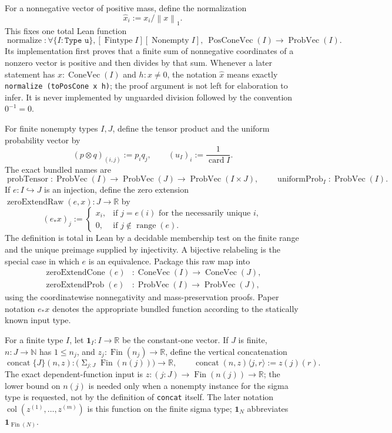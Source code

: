 \documentclass[9pt]{extarticle}
\theoremstyle{definition}
\theoremstyle{remark}
\newcommand{\R}{\mathbb R}
\newcommand{\N}{\mathbb N}
\newcommand{\one}{\mathbf 1}
\newcommand{\col}{\operatorname{col}}
\newcommand{\norm}[1]{\left\lVert #1\right\rVert}
\newcommand{\card}{\operatorname{card}}
\begin{document}
For a nonnegative vector of positive mass, define the normalization
\begin{equation}
 \widehat x_i:=x_i/\norm{x}_1.
 \label{eq:foundation-normalize}
\end{equation}
This fixes one total Lean function
\[
 \operatorname{normalize}:
 \forall\{I:\texttt{Type u}\},
 [\operatorname{Fintype}I][\operatorname{Nonempty}I],\
 \operatorname{PosConeVec}(I)\longrightarrow\operatorname{ProbVec}(I).
\]
Its implementation first proves that a finite sum of nonnegative
coordinates of a nonzero vector is positive and then divides by that sum.
Whenever a later statement has $x:\operatorname{ConeVec}(I)$ and
$h:x\neq0$, the notation $\widehat x$ means exactly
\texttt{normalize (toPosCone x h)}; the proof argument is not left for
elaboration to infer.  It is never implemented by
unguarded division followed by the convention $0^{-1}=0$.

For finite nonempty types $I,J$, define the tensor product and the uniform
probability vector by
\[
 (p\otimes q)_{(i,j)}:=p_iq_j,
 \qquad (u_I)_i:=\frac1{\card I}.
\]
The exact bundled names are
\[
 \operatorname{probTensor}:
 \operatorname{ProbVec}(I)\to\operatorname{ProbVec}(J)
 \to\operatorname{ProbVec}(I\times J),
 \qquad
 \operatorname{uniformProb}_I:\operatorname{ProbVec}(I).
\]
If $e:I\hookrightarrow J$ is an injection, define the zero extension
$\operatorname{zeroExtendRaw}(e,x):J\to\R$ by
\[
 (e_*x)_j:=
 \begin{cases}
  x_i,&\text{if }j=e(i)\text{ for the necessarily unique }i,\\
  0,&\text{if }j\notin\operatorname{range}(e).
 \end{cases}
\]
The definition is total in Lean by a decidable membership test on the finite
range and the unique preimage supplied by injectivity.  A bijective relabeling
is the special case in which $e$ is an equivalence.
Package this raw map into
\begin{align*}
 \operatorname{zeroExtendCone}(e)&:
  \operatorname{ConeVec}(I)\to\operatorname{ConeVec}(J),\\
 \operatorname{zeroExtendProb}(e)&:
  \operatorname{ProbVec}(I)\to\operatorname{ProbVec}(J),
\end{align*}
using the coordinatewise nonnegativity and mass-preservation proofs.  Paper
notation $e_*x$ denotes the appropriate bundled function according to the
statically known input type.

For a finite type $I$, let $\one_I:I\to\R$ be the constant-one vector.  If
$J$ is finite, $n:J\to\N$ has $1\leq n_j$, and
$z_j:\operatorname{Fin}(n_j)\to\R$, define the vertical concatenation
\[
 \operatorname{concat}\{J\}(n,z):
 \bigl(\mathop{\Sigma}_{j:J}\operatorname{Fin}(n(j))\bigr)\to\R,
 \qquad \operatorname{concat}(n,z)\langle j,r\rangle:=z(j)(r).
\]
The exact dependent-function input is
$z:(j:J)\to\operatorname{Fin}(n(j))\to\R$; the lower bound on $n(j)$ is
needed only when a nonempty instance for the sigma type is requested, not by
the definition of \texttt{concat} itself.
The later notation $\col(z^{(1)},\ldots,z^{(m)})$ is this function on the
finite sigma type; $\one_N$ abbreviates $\one_{\operatorname{Fin}(N)}$.
\end{document}
